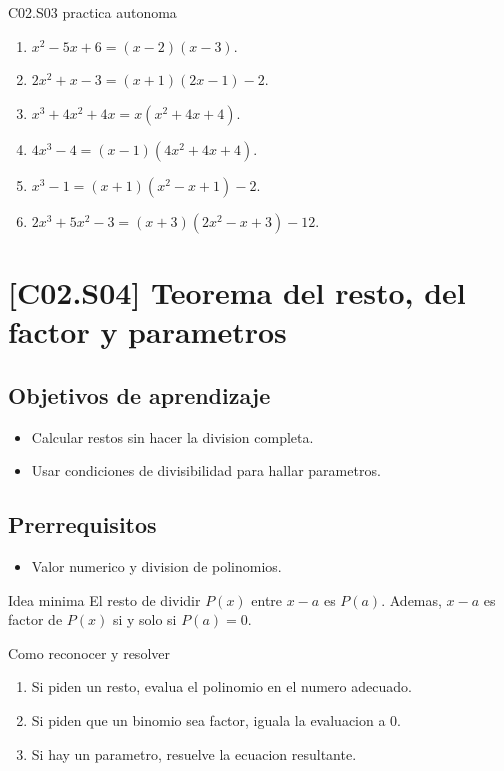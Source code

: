 \begin{fullsolution}{C02.S03 practica autonoma}
\begin{enumerate}[label=\textbf{PX-C02.S03-\arabic*:}, leftmargin=*]
  \item \(x^2-5x+6=(x-2)(x-3)\).
  \item \(2x^2+x-3=(x+1)(2x-1)-2\).
  \item \(x^3+4x^2+4x=x(x^2+4x+4)\).
  \item \(4x^3-4=(x-1)(4x^2+4x+4)\).
  \item \(x^3-1=(x+1)(x^2-x+1)-2\).
  \item \(2x^3+5x^2-3=(x+3)(2x^2-x+3)-12\).
\end{enumerate}
\end{fullsolution}

\section{[C02.S04] Teorema del resto, del factor y parametros}

\subsection*{Objetivos de aprendizaje}
\begin{itemize}
  \item Calcular restos sin hacer la division completa.
  \item Usar condiciones de divisibilidad para hallar parametros.
\end{itemize}

\subsection*{Prerrequisitos}
\begin{itemize}
  \item Valor numerico y division de polinomios.
\end{itemize}

\begin{theorybox}{Idea minima}
El resto de dividir \(P(x)\) entre \(x-a\) es \(P(a)\). Ademas, \(x-a\) es factor de \(P(x)\)
si y solo si \(P(a)=0\).
\end{theorybox}

\begin{methodbox}{Como reconocer y resolver}
\begin{enumerate}
  \item Si piden un resto, evalua el polinomio en el numero adecuado.
  \item Si piden que un binomio sea factor, iguala la evaluacion a \(0\).
  \item Si hay un parametro, resuelve la ecuacion resultante.
\end{enumerate}
\end{methodbox}

